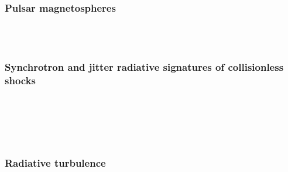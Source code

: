 \documentclass{aa}
\begin{document}
\subsubsection{Pulsar magnetospheres}
\citep{Cerutti_2016a} \\
\citep{Philippov_2018} \\


\subsubsection{Synchrotron and jitter radiative signatures of collisionless shocks}
\citep{Medvedev_2009} \\
\citep{Sironi_2009} \\
\citep{Kirk_2010} \\
\citep{Nishikawa_2011} \\

\subsubsection{Radiative turbulence}
\citep{Zhdankin_2019}











\end{document}
